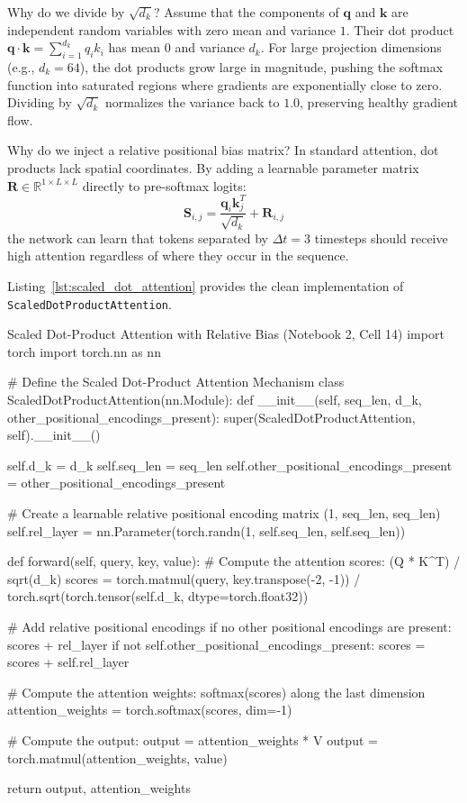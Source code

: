 \documentclass[11pt,a4paper]{article}
\begin{document}
Why do we divide by $\sqrt{d_k}$? Assume that the components of $\mathbf{q}$ and $\mathbf{k}$ are independent random variables with zero mean and variance $1$. Their dot product $\mathbf{q} \cdot \mathbf{k} = \sum_{i=1}^{d_k} q_i k_i$ has mean $0$ and variance $d_k$. For large projection dimensions (e.g., $d_k = 64$), the dot products grow large in magnitude, pushing the softmax function into saturated regions where gradients are exponentially close to zero. Dividing by $\sqrt{d_k}$ normalizes the variance back to $1.0$, preserving healthy gradient flow.

Why do we inject a relative positional bias matrix? In standard attention, dot products lack spatial coordinates. By adding a learnable parameter matrix $\mathbf{R} \in \mathbb{R}^{1 \times L \times L}$ directly to pre-softmax logits:
\begin{equation}
\mathbf{S}_{i, j} = \frac{\mathbf{q}_i \mathbf{k}_j^T}{\sqrt{d_k}} + \mathbf{R}_{i, j}
\end{equation}
the network can learn that tokens separated by $\Delta t = 3$ timesteps should receive high attention regardless of where they occur in the sequence.

Listing~\ref{lst:scaled_dot_attention} provides the clean implementation of \texttt{ScaledDotProductAttention}.

\begin{solutioncode}[label=lst:scaled_dot_attention]{Scaled Dot-Product Attention with Relative Bias (Notebook 2, Cell 14)}
import torch
import torch.nn as nn

# Define the Scaled Dot-Product Attention Mechanism
class ScaledDotProductAttention(nn.Module):
    def __init__(self, seq_len, d_k, other_positional_encodings_present):
        super(ScaledDotProductAttention, self).__init__()

        self.d_k = d_k
        self.seq_len = seq_len
        self.other_positional_encodings_present = other_positional_encodings_present

        # Create a learnable relative positional encoding matrix (1, seq_len, seq_len)
        self.rel_layer = nn.Parameter(torch.randn(1, self.seq_len, self.seq_len))

    def forward(self, query, key, value):
        # Compute the attention scores: (Q * K^T) / sqrt(d_k)
        scores = torch.matmul(query, key.transpose(-2, -1)) / torch.sqrt(torch.tensor(self.d_k, dtype=torch.float32))
        
        # Add relative positional encodings if no other positional encodings are present: scores + rel_layer
        if not self.other_positional_encodings_present:
            scores = scores + self.rel_layer
        
        # Compute the attention weights: softmax(scores) along the last dimension
        attention_weights = torch.softmax(scores, dim=-1)
        
        # Compute the output: output = attention_weights * V
        output = torch.matmul(attention_weights, value)
        
        return output, attention_weights
\end{solutioncode}
\end{document}
